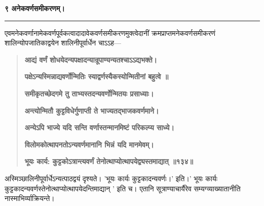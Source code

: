 \documentclass[11pt, openany]{book}
\begin{document}
\onehalfspacing
\begin{center}
\textbf{\large ९ अनेकवर्णसमीकरणम्।}

\rule{0.1\linewidth}{0.5pt}
\end{center}
\begin{sloppypar}
\hangindent=0.2in \hspace{0.2in}एवमनेकवर्णानामेकवर्णपूर्वकत्वादादावेकवर्णसमीकरणमुक्त्वेदानीं क्रमप्राप्तमनेकवर्णसमीकरणं शालिन्योपजातिकाद्वयेन शालिनीपूर्वार्धेन चाऽऽह---

\begin{quote}
\hspace{1in}\textbf{आद्यं वर्णं शोधयेदन्यपक्षादन्यान्रूपाण्यन्यतश्चाऽऽद्यभक्ते।}

\hspace{1in}\textbf{पक्षेऽन्यस्मिन्नाद्यवर्णोन्मितिः स्याद्वर्णस्यैकस्योन्मितीनां बहुत्वे ॥}

\hspace{1in}\textbf{समीकृतच्छेदगमे तु ताभ्यस्तदन्यवर्णोन्मितयः प्रसाध्याः।}

\hspace{1in}\textbf{अन्त्योन्मितौ कुट्टविधेर्गुणाप्ती ते भाज्यतद्भाजकवर्णमाने।}

\hspace{1in}\textbf{अन्येऽपि भाज्ये यदि सन्ति वर्णास्तन्मानमिष्टं परिकल्प्य साध्ये।}

\hspace{1in}\textbf{विलोमकोत्थापनतोऽन्यवर्णमानानि भिन्नं यदि मानमेवम्।}

\hspace{1in}\textbf{भूयः कार्य: कुट्टकोऽत्रान्त्यवर्णं तेनोत्थाप्योत्थापयेद्व्यस्तमाद्यात् ॥१३४॥}
\end{quote}

\hangindent=0.2in \hspace{0.2in}अस्मिञ्छालिनीपूर्वार्धेऽन्यत्पाठद्वयं दृश्यते। 'भूयः कार्यः कुट्टकादन्यवर्णः।' इति।' भूयः कार्यः कुट्टकादन्यवर्णस्तेनोत्थाप्योत्थापयेदन्तिमाद्यान् ' इति च। एतानि सूत्राण्याचार्यैरेव सम्यग्व्याख्यातानीति नास्माभिर्व्याक्रियन्ते।\\


\end{sloppypar}
\end{document}
